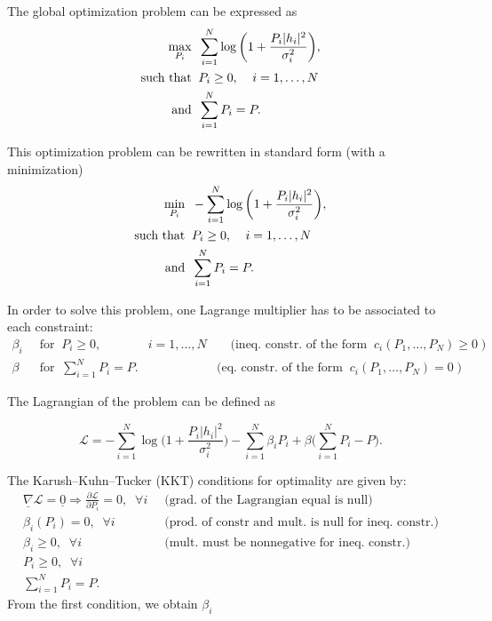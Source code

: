 \documentclass [a4paper, 11pt] {article}
\begin{document}
\begin{solution}
        The global optimization problem can be expressed as
        \begin{align}
            \max_{P_i} \; \; & \sum_{i=1}^{N} \log\bigg(1 + \frac{P_i |h_i|^2}{\sigma_i^2} \bigg)  ,\\
            \text{\normalfont such that} \; \;  & P_i \geq 0, \; \; \; \;  i = 1,\hdots,N \\
            \text{and}\; \; & \sum_{i=1}^{N} P_i = P.
        \end{align}


        This optimization problem can be rewritten in standard form (with a minimization)
        \begin{align}
            \min_{P_i} \; \; & -\sum_{i=1}^{N} \log\bigg(1 + \frac{P_i |h_i|^2}{\sigma_i^2} \bigg) , \\
            \text{\normalfont such that} \; \;  & P_i \geq 0, \; \; \; \;  i = 1,\hdots,N\\
            \text{and}\; \; & \sum_{i=1}^{N} P_i = P .
        \end{align}

        In order to solve this problem, one Lagrange multiplier has to be associated to each constraint:
        \begin{align}
            \beta_i & \; \; \text{for} \; \; P_i \geq 0, \; \; & i = 1,\hdots,N & \; \; \; \; \text{(ineq. constr. of the form} \; \; c_i(P_1,\hdots,P_N) \geq 0 \; )\\
            \beta & \; \; \text{for} \; \; \sum_{i=1}^{N}P_i=P. & & \text{(eq. constr. of the form} \; \; c_i(P_1,\hdots,P_N) = 0 \; )
        \end{align}


        The Lagrangian of the problem can be defined as

        \begin{equation}
            \mathcal{L} = -\sum_{i=1}^{N} \log\bigg(1 + \frac{P_i |h_i|^2}{\sigma_i^2} \bigg) - \sum_{i=1}^{N} \beta_i P_i + \beta \Big(\sum_{i=1}^{N}P_i - P \Big).
        \end{equation}

        The Karush–Kuhn–Tucker (KKT) conditions for optimality are given by:
        \begin{align}
            \underline{\nabla}\mathcal{L} = \underline{0} \Rightarrow \frac{\partial \mathcal{L} }{\partial P_i} = 0,  \; \; \forall i & \; \; \text{(grad. of the Lagrangian equal is null)}\\
            \beta_i (P_i) = 0, \; \; \forall i & \; \; \text{(prod. of constr and mult. is null for ineq. constr.)}\\
            \beta_i \geq 0, \; \; \forall i & \; \; \text{(mult. must be nonnegative for ineq. constr.)}\\
            P_i \geq 0, \; \; \forall i & \\
            \sum_{i=1}^{N} P_i = P. &
        \end{align}
        From the first condition, we obtain $\beta_i$


\end{solution}
\end{document}
